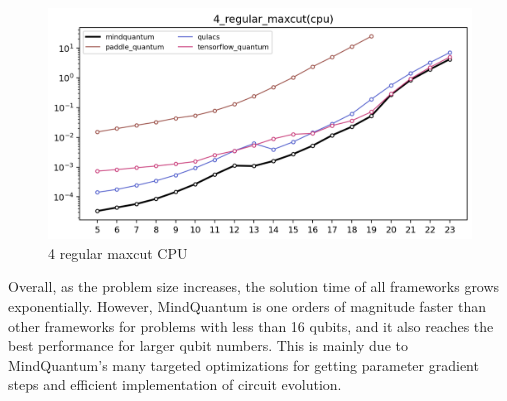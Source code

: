 \begin{figure}[htbp]
    \begin{center}
        \includegraphics[width=0.7\linewidth]{7_figures/4_regular_CPU.png}
    \end{center}
    \caption{4 regular maxcut CPU}
\end{figure}

Overall, as the problem size increases, the solution time of all frameworks grows exponentially. However, MindQuantum is one orders of magnitude faster than other frameworks for problems with less than 16 qubits, and it also reaches the best performance for larger qubit numbers. This is mainly due to MindQuantum’s many targeted optimizations for getting parameter gradient steps and efficient implementation of circuit evolution.